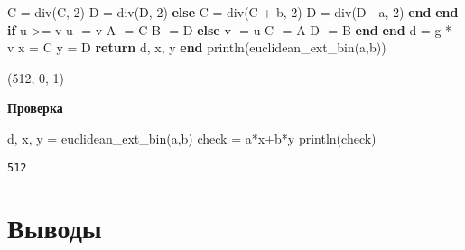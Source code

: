 \documentclass[
]{article}
\newenvironment{Shaded}{}{}
\newcommand{\ControlFlowTok}[1]{\textcolor[rgb]{0.00,0.44,0.13}{\textbf{#1}}}
\newcommand{\FloatTok}[1]{\textcolor[rgb]{0.25,0.63,0.44}{#1}}
\newcommand{\FunctionTok}[1]{\textcolor[rgb]{0.02,0.16,0.49}{#1}}
\newcommand{\KeywordTok}[1]{\textcolor[rgb]{0.00,0.44,0.13}{\textbf{#1}}}
\newcommand{\NormalTok}[1]{#1}
\newcommand{\OperatorTok}[1]{\textcolor[rgb]{0.40,0.40,0.40}{#1}}
\begin{document}
\begin{Shaded}
\begin{Highlighting}[]
\NormalTok{                C }\OperatorTok{=} \FunctionTok{div}\NormalTok{(C, }\FloatTok{2}\NormalTok{)}
\NormalTok{                D }\OperatorTok{=} \FunctionTok{div}\NormalTok{(D, }\FloatTok{2}\NormalTok{)}
            \ControlFlowTok{else}
\NormalTok{                C }\OperatorTok{=} \FunctionTok{div}\NormalTok{(C }\OperatorTok{+}\NormalTok{ b, }\FloatTok{2}\NormalTok{)}
\NormalTok{                D }\OperatorTok{=} \FunctionTok{div}\NormalTok{(D }\OperatorTok{{-}}\NormalTok{ a, }\FloatTok{2}\NormalTok{)}
            \ControlFlowTok{end}
        \ControlFlowTok{end}
        \ControlFlowTok{if}\NormalTok{ u }\OperatorTok{\textgreater{}=}\NormalTok{ v}
\NormalTok{            u }\OperatorTok{{-}=}\NormalTok{ v}
\NormalTok{            A }\OperatorTok{{-}=}\NormalTok{ C}
\NormalTok{            B }\OperatorTok{{-}=}\NormalTok{ D}
        \ControlFlowTok{else}
\NormalTok{            v }\OperatorTok{{-}=}\NormalTok{ u}
\NormalTok{            C }\OperatorTok{{-}=}\NormalTok{ A}
\NormalTok{            D }\OperatorTok{{-}=}\NormalTok{ B}
        \ControlFlowTok{end}
    \ControlFlowTok{end}
\NormalTok{    d }\OperatorTok{=}\NormalTok{ g }\OperatorTok{*}\NormalTok{ v}
\NormalTok{    x }\OperatorTok{=}\NormalTok{ C}
\NormalTok{    y }\OperatorTok{=}\NormalTok{ D}
    \ControlFlowTok{return}\NormalTok{ d, x, y}
\KeywordTok{end}
\FunctionTok{println}\NormalTok{(}\FunctionTok{euclidean\_ext\_bin}\NormalTok{(a,b))}


\NormalTok{    (}\FloatTok{512}\NormalTok{, }\FloatTok{0}\NormalTok{, }\FloatTok{1}\NormalTok{)}
\end{Highlighting}
\end{Shaded}

\textbf{Проверка}

\begin{Shaded}
\begin{Highlighting}[]
\NormalTok{d, x, y }\OperatorTok{=} \FunctionTok{euclidean\_ext\_bin}\NormalTok{(a,b)}
\NormalTok{check }\OperatorTok{=}\NormalTok{ a}\OperatorTok{*}\NormalTok{x}\OperatorTok{+}\NormalTok{b}\OperatorTok{*}\NormalTok{y }
\FunctionTok{println}\NormalTok{(check)}
\end{Highlighting}
\end{Shaded}

\begin{verbatim}
512
\end{verbatim}

\section{Выводы}\label{ux432ux44bux432ux43eux434ux44b}
\end{document}

